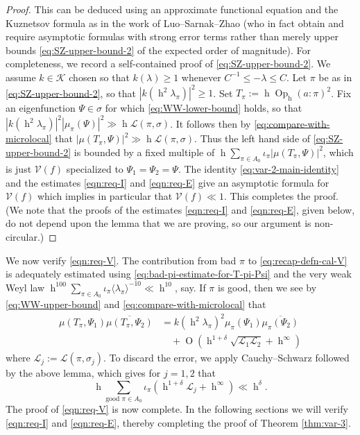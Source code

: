 \documentclass[reqno,10pt]{amsart}
\theoremstyle{plain} %
\theoremstyle{definition}
\theoremstyle{plain} %
\theoremstyle{remark}
\theoremstyle{itplain} %
\theoremstyle{remark} %
\renewcommand{\geq}{\geqslant}
\renewcommand{\leq}{\leqslant}
\numberwithin{equation}{section}
\def\O{\operatorname{O}}
\DeclareMathOperator{\Opp}{Op}
\DeclareMathOperator{\h}{h}
\begin{document}
\begin{proof}
  This can be deduced using an approximate functional equation and the Kuznetsov formula as in the work of Luo--Sarnak--Zhao (who in fact obtain and require asymptotic formulas with strong error terms rather than merely upper bounds \eqref{eq:SZ-upper-bound-2} of the expected order of magnitude).  For completeness, we record a self-contained proof of \eqref{eq:SZ-upper-bound-2}.
  We assume $k \in \mathcal{K}$ chosen so that $k(\lambda) \geq 1$ whenever $C^{-1} \leq -\lambda \leq C$.  Let $\pi$ be as in \eqref{eq:SZ-upper-bound-2}, so that $|k(\h^2 \lambda_\pi)|^2 \geq 1$.  Set $T_\pi := \h \Opp_{\h}(a:\pi)^2$.  Fix an eigenfunction $\Psi \in \sigma$ for which  \eqref{eq:WW-lower-bound} holds, so that $|k(\h^2 \lambda_\pi)|^2 |\mu_\pi(\Psi)|^2 \gg \h \mathcal{L}(\pi,\sigma)$.
  It follows then by \eqref{eq:compare-with-microlocal} that $|\mu(T_\pi,\Psi)|^2 \gg \h \mathcal{L}(\pi,\sigma)$.  Thus the left hand side of \eqref{eq:SZ-upper-bound-2} is bounded by a fixed multiple of $\h \sum_{\pi \in A_0 } \iota_{\pi} |\mu(T_\pi,\Psi)|^2$, which is just $\mathcal{V}(f)$ specialized to $\Psi_1 = \Psi_2 = \Psi$.  The identity \eqref{eq:var-2-main-identity} and the estimates \eqref{eqn:req-I} and \eqref{eqn:req-E} give an asymptotic formula for $\mathcal{V}(f)$ which implies in particular that $\mathcal{V}(f) \ll 1$.  This completes the proof.  (We note that the proofs of the estimates \eqref{eqn:req-I} and \eqref{eqn:req-E}, given below, do not depend upon the lemma that we are proving, so our argument is non-circular.)
\end{proof}


We now verify \eqref{eqn:req-V}.  The contribution from bad $\pi$ to \eqref{eq:recap-defn-cal-V} is adequately estimated using \eqref{eq:bad-pi-estimate-for-T-pi-Psi} and the very weak Weyl law $\h^{100} \sum_{\pi \in A_0} \iota_\pi \langle \lambda_\pi \rangle^{-10} \ll \h^{10}$, say.  If $\pi$ is good, then we see by \eqref{eq:WW-upper-bound} and \eqref{eq:compare-with-microlocal} that
\begin{equation}\label{eqn:approx-for-mu-mu}
  \begin{split}
    \mu(T_\pi,\Psi_1) \overline{\mu(T_\pi,\Psi_2)} &= k(\h^2 \lambda_\pi)^2 \mu_\pi(\Psi_1) \overline{\mu_\pi(\Psi_2)}
    \\
    &\quad + \O(\h^{1+\delta} \sqrt{\mathcal{L}_1 \mathcal{L}_2} + \h^{\infty})
  \end{split}
\end{equation}
where $\mathcal{L}_j := \mathcal{L}(\pi,\sigma_j)$.  To discard the error, we apply Cauchy--Schwarz followed by the above lemma, which gives for $j=1,2$ that
\[
  \h \sum_{\text{good }\pi \in A_0} \iota_{\pi} (\h^{1+\delta} \mathcal{L}_j + \h^\infty) \ll \h^\delta.
\]
The proof of \eqref{eqn:req-V} is now complete.  In the following sections we will verify \eqref{eqn:req-I} and \eqref{eqn:req-E}, thereby completing the proof of Theorem \ref{thm:var-3}.
\end{document}
